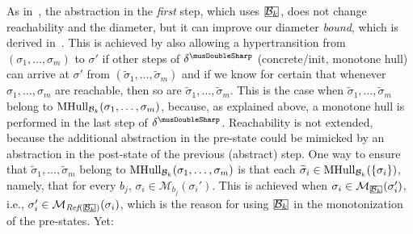 \documentclass[acmsmall,screen]{acmart}
\newcommand{\tr}{\delta}
\newcommand{\set}[1]{\{{#1}\}}
\newcommand{\bkwrch}[1]{\mathcal{B}_{#1}}
\newcommand{\monox}[2]{\mathcal{M}_{#2}({#1})}
\newcommand{\mhull}[2]{{\rm MHull}_{#2}({#1})}
\newcommand{\absr}[1]{{#1}^{\musDoubleSharp}}
\newcommand{\reflect}[1]{\textit{Ref}({#1})}
\newcommand\mathbox[1]{\mathord{\ThisStyle{%
  \fboxsep0\LMpt\relax\kern1\LMpt\fbox{$\SavedStyle#1$}\kern1\LMpt}}}
\newcommand{\cubejoin}[1]{\mathbox{#1}}
\begin{document}
As in~, the abstraction in the \emph{first} step, which uses $\cubejoin{\bkwrch{k}}$, does not change %
reachability
%
and the diameter, but it can improve our diameter \emph{bound}, which is derived in~.
%
%
%
%
%
This is achieved by also allowing a hypertransition from $(\sigma_1,\ldots,\sigma_m)$ to $\sigma'$ if other steps of $\absr{\tr}$ (concrete/init, monotone hull) can arrive at $\sigma'$ from $(\widetilde{\sigma}_1,\ldots,\widetilde{\sigma}_m)$ and if we know for certain that whenever $\sigma_1,\ldots,\sigma_m$ are reachable, then so are $\widetilde{\sigma}_1,\ldots,\widetilde{\sigma}_m$.
%
This is the case when $\widetilde{\sigma}_1,\ldots,\widetilde{\sigma}_m$ belong to $\mhull{\sigma_1,\ldots,\sigma_m}{\bkwrch{k}}$, because, as explained above, a monotone hull is performed in the last step of $\absr{\tr}$. %
%
%
Reachability is not extended,
because the additional abstraction in the pre-state could be mimicked by an abstraction in the post-state of the previous (abstract) step.
One way to ensure that $\widetilde{\sigma}_1,\ldots,\widetilde{\sigma}_m$ belong to $\mhull{\sigma_1,\ldots,\sigma_m}{\bkwrch{k}}$ is that each $\widetilde{\sigma}_i \in \mhull{\set{\sigma_i}}{\bkwrch{k}}$, namely, that
%
for every $b_j$, $\sigma_i \in \monox{\sigma_i'}{b_j}$. This is achieved when $\sigma_i \in \monox{\sigma_i'}{\cubejoin{\bkwrch{k}}}$, i.e., $\sigma_i' \in \monox{\sigma_i}{\reflect{\cubejoin{\bkwrch{k}}}}$, which is the reason for using $\cubejoin{\bkwrch{k}}$ in the monotonization of the pre-states.
Yet:
\end{document}
